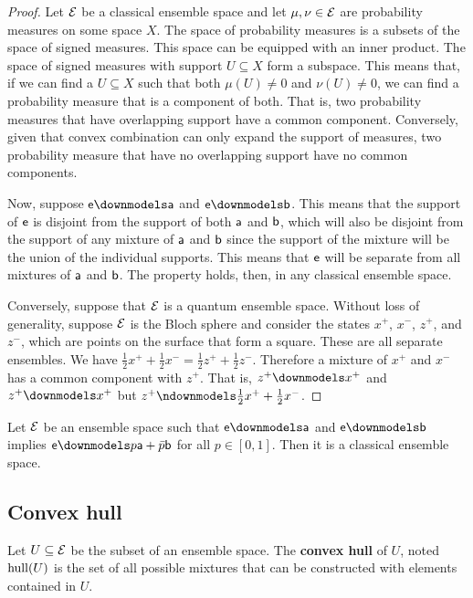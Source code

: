 \begin{proof}
	Let $\Ens$ be a classical ensemble space and let $\mu, \nu \in \Ens$ are probability measures on some space $X$. The space of probability measures is a subsets of the space of signed measures. This space can be equipped with an inner product. The space of signed measures with support $U \subseteq X$ form a subspace. This means that, if we can find a $U \subseteq X$ such that both $\mu(U) \neq 0$ and $\nu(U) \neq 0$, we can find a probability measure that is a component of both. That is, two probability measures that have overlapping support have a common component. Conversely, given that convex combination can only expand the support of measures, two probability measure that have no overlapping support have no common components.
	
	Now, suppose $\ens \distinct \ens[a]$ and $\ens \distinct \ens[b]$. This means that the support of $\ens$ is disjoint from the support of both $\ens[a]$ and $\ens[b]$, which will also be disjoint from the support of any mixture of $\ens[a]$ and $\ens[b]$ since the support of the mixture will be the union of the individual supports. This means that $\ens$ will be separate from all mixtures of $\ens[a]$ and $\ens[b]$. The property holds, then, in any classical ensemble space.
	
	Conversely, suppose that $\Ens$ is a quantum ensemble space. Without loss of generality, suppose $\Ens$ is the Bloch sphere and consider the states $x^+$, $x^-$, $z^+$, and $z^-$, which are points on the surface that form a square. These are all separate ensembles. We have $\frac{1}{2} x^+ + \frac{1}{2} x^- = \frac{1}{2} z^+ + \frac{1}{2} z^-$. Therefore a mixture of $x^+$ and $x^-$ has a common component with $z^+$. That is, $z^+ \distinct x^+$ and $z^+ \distinct x^+$ but $z^+ \ndistinct \frac{1}{2} x^+ + \frac{1}{2} x^-$.
\end{proof}

\begin{conj}
	Let $\Ens$ be an ensemble space such that $\ens \distinct \ens[a]$ and $\ens \distinct \ens[b]$ implies $\ens \distinct p \ens[a] + \bar{p} \ens[b]$ for all $p \in [0,1]$. Then it is a classical ensemble space.
\end{conj}


\subsection{Convex hull}

\begin{defn}
	Let $U \subseteq \Ens$ be the subset of an ensemble space. The \textbf{convex hull} of $U$, noted $\hull(U)$ is the set of all possible mixtures that can be constructed with elements contained in $U$.
\end{defn}

